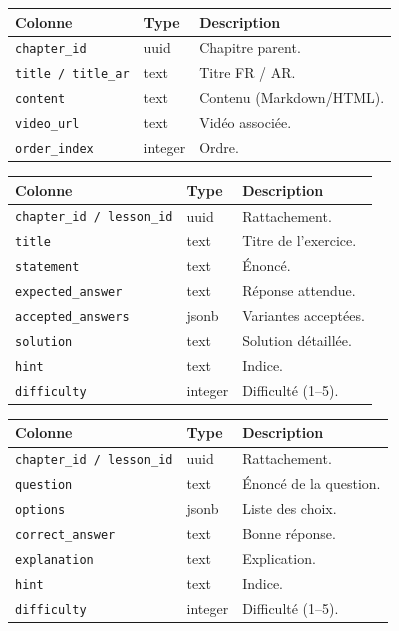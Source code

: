 \begin{longtable}{p{3.6cm}p{2.6cm}p{8cm}}
\toprule \textbf{Colonne} & \textbf{Type} & \textbf{Description} \\ \midrule \endhead
\texttt{chapter\_id} & uuid & Chapitre parent. \\
\texttt{title / title\_ar} & text & Titre FR / AR. \\
\texttt{content} & text & Contenu (Markdown/HTML). \\
\texttt{video\_url} & text & Vidéo associée. \\
\texttt{order\_index} & integer & Ordre. \\
\bottomrule
\end{longtable}

\begin{longtable}{p{3.6cm}p{2.6cm}p{8cm}}
\toprule \textbf{Colonne} & \textbf{Type} & \textbf{Description} \\ \midrule \endhead
\texttt{chapter\_id / lesson\_id} & uuid & Rattachement. \\
\texttt{title} & text & Titre de l'exercice. \\
\texttt{statement} & text & Énoncé. \\
\texttt{expected\_answer} & text & Réponse attendue. \\
\texttt{accepted\_answers} & jsonb & Variantes acceptées. \\
\texttt{solution} & text & Solution détaillée. \\
\texttt{hint} & text & Indice. \\
\texttt{difficulty} & integer & Difficulté (1--5). \\
\bottomrule
\end{longtable}

\begin{longtable}{p{3.6cm}p{2.6cm}p{8cm}}
\toprule \textbf{Colonne} & \textbf{Type} & \textbf{Description} \\ \midrule \endhead
\texttt{chapter\_id / lesson\_id} & uuid & Rattachement. \\
\texttt{question} & text & Énoncé de la question. \\
\texttt{options} & jsonb & Liste des choix. \\
\texttt{correct\_answer} & text & Bonne réponse. \\
\texttt{explanation} & text & Explication. \\
\texttt{hint} & text & Indice. \\
\texttt{difficulty} & integer & Difficulté (1--5). \\
\bottomrule
\end{longtable}

